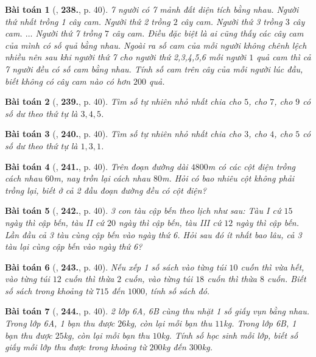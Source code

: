 \documentclass{article}
\numberwithin{equation}{section}
\newtheorem{baitoan}{Bài toán}[section]
\begin{document}
\begin{baitoan}[\cite{Binh_Toan_6_tap_1}, \textbf{238.}, p. 40]
	7 người có 7 mảnh đất diện tích bằng nhau. Người thứ nhất trồng 1 cây cam. Người thứ 2 trồng $2$ cây cam. Người thứ 3 trồng $3$ cây cam. $\ldots$ Người thứ 7 trồng $7$ cây cam. Điều đặc biệt là ai cũng thấy các cây cam của mình có số quả bằng nhau. Ngoài ra số cam của mỗi người không chênh lệch nhiều nên sau khi người thứ 7 cho người thứ 2,3,4,5,6 mỗi người $1$ quả cam thì cả 7 người đều có số cam bằng nhau. Tính số cam trên cây của mỗi người lúc đầu, biết không có cây cam nào có hơn $200$ quả.
\end{baitoan}

\begin{baitoan}[\cite{Binh_Toan_6_tap_1}, \textbf{239.}, p. 40]
	Tìm số tự nhiên nhỏ nhất chia cho $5$, cho $7$, cho $9$ có số dư theo thứ tự là $3,4,5$.
\end{baitoan}

\begin{baitoan}[\cite{Binh_Toan_6_tap_1}, \textbf{240.}, p. 40]
	Tìm số tự nhiên nhỏ nhất chia cho $3$, cho $4$, cho $5$ có số dư theo thứ tự là $1,3,1$.
\end{baitoan}

\begin{baitoan}[\cite{Binh_Toan_6_tap_1}, \textbf{241.}, p. 40]
	Trên đoạn đường dài $4800$\emph{m} có các cột điện trồng cách nhau $60$\emph{m}, nay trồn lại cách nhau $80$\emph{m}. Hỏi có bao nhiêu cột không phải trồng lại, biết ở cả 2 đầu đoạn đường đều có cột điện?
\end{baitoan}

\begin{baitoan}[\cite{Binh_Toan_6_tap_1}, \textbf{242.}, p. 40]
	3 con tàu cập bến theo lịch như sau: Tàu I cứ $15$ ngày thì cập bến, tàu II cứ $20$ ngày thì cập bến, tàu III cứ $12$ ngày thì cập bến. Lần đầu cả 3 tàu cùng cập bến vào ngày thứ 6. Hỏi sau đó ít nhất bao lâu, cả 3 tàu lại cùng cập bến vào ngày thứ 6?
\end{baitoan}

\begin{baitoan}[\cite{Binh_Toan_6_tap_1}, \textbf{243.}, p. 40]
	Nếu xếp 1 số sách vào từng túi $10$ cuốn thì vừa hết, vào từng túi $12$ cuốn thì thừa $2$ cuốn, vào từng túi $18$ cuốn thì thừa $8$ cuốn. Biết số sách trong khoảng từ $715$ đến $1000$, tính số sách đó.
\end{baitoan}

\begin{baitoan}[\cite{Binh_Toan_6_tap_1}, \textbf{244.}, p. 40]
	2 lớp 6A, 6B cùng thu nhặt 1 số giấy vụn bằng nhau. Trong lớp 6A, 1 bạn thu được $26$\emph{kg}, còn lại mỗi bạn thu $11$\emph{kg}. Trong lớp 6B, 1 bạn thu được $25$\emph{kg}, còn lại mỗi bạn thu $10$\emph{kg}. Tính số học sinh mỗi lớp, biết số giấy mỗi lớp thu được trong khoảng từ $200$\emph{kg} đến $300$\emph{kg}.
\end{baitoan}
\end{document}
